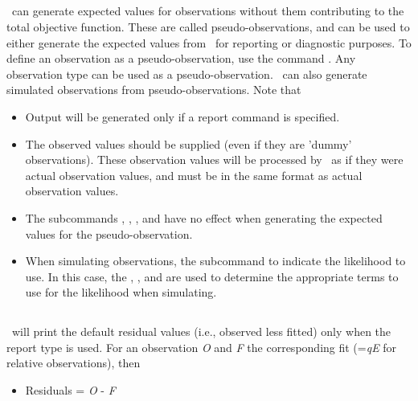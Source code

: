 \subsection{}\label{sec:PseudoObservations}

\CNAME\ can generate expected values for observations without them contributing to the total objective function. These are called pseudo-observations, and can be used to either generate the expected values from \CNAME\ for reporting or diagnostic purposes. To define an observation as a pseudo-observation, use the command . Any observation type can be used as a pseudo-observation. \CNAME\ can also generate simulated observations from pseudo-observations. Note that

\begin{itemize}
  \item Output will be generated only if a report command  is specified.
  \item The observed values should be supplied (even if they are 'dummy' observations). These observation values will be processed by \CNAME\ as if they were actual observation values, and must be in the same format as actual observation values.
  \item The subcommands , , , and  have no effect when generating the expected values for the pseudo-observation.
  \item When simulating observations, the subcommand  to indicate the likelihood to use. In this case, the , , and  are used to determine the appropriate terms to use for the likelihood when simulating.
\end{itemize}


\subsection{}\label{sec:Residuals}

\CNAME\ will print the default residual values (i.e., observed less fitted) only when the report type  is used. For an observation \textit{O} and \textit{F} the corresponding fit (=\textit{qE} for relative observations), then

\begin{itemize}
	\item Residuals = \textit{O} - \textit{F}
\end{itemize}

